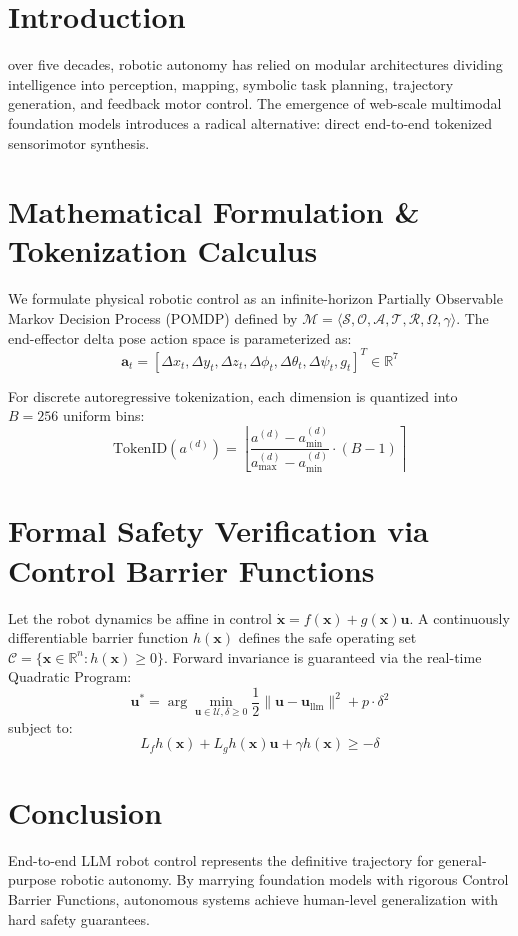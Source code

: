 \documentclass[lettersize,journal]{IEEEtran}
\begin{document}
\section{Introduction}
 over five decades, robotic autonomy has relied on modular architectures dividing intelligence into perception, mapping, symbolic task planning, trajectory generation, and feedback motor control. The emergence of web-scale multimodal foundation models introduces a radical alternative: direct end-to-end tokenized sensorimotor synthesis.

\section{Mathematical Formulation \& Tokenization Calculus}
We formulate physical robotic control as an infinite-horizon Partially Observable Markov Decision Process (POMDP) defined by $\mathcal{M} = \langle \mathcal{S}, \mathcal{O}, \mathcal{A}, \mathcal{T}, \mathcal{R}, \Omega, \gamma \rangle$. The end-effector delta pose action space is parameterized as:
\begin{equation}
\mathbf{a}_t = \left[ \Delta x_t, \Delta y_t, \Delta z_t, \Delta \phi_t, \Delta \theta_t, \Delta \psi_t, g_t \right]^T \in \mathbb{R}^7
\end{equation}

For discrete autoregressive tokenization, each dimension is quantized into $B = 256$ uniform bins:
\begin{equation}
\text{TokenID}(a^{(d)}) = \left\lfloor \frac{a^{(d)} - a_{\min}^{(d)}}{a_{\max}^{(d)} - a_{\min}^{(d)}} \cdot (B - 1) \right\rceil
\end{equation}

\section{Formal Safety Verification via Control Barrier Functions}
Let the robot dynamics be affine in control $\dot{\mathbf{x}} = f(\mathbf{x}) + g(\mathbf{x})\mathbf{u}$. A continuously differentiable barrier function $h(\mathbf{x})$ defines the safe operating set $\mathcal{C} = \{\mathbf{x} \in \mathbb{R}^n : h(\mathbf{x}) \ge 0\}$. Forward invariance is guaranteed via the real-time Quadratic Program:
\begin{equation}
\mathbf{u}^* = \arg\min_{\mathbf{u} \in \mathcal{U}, \delta \ge 0} \frac{1}{2} \|\mathbf{u} - \mathbf{u}_{\text{llm}}\|^2 + p \cdot \delta^2
\end{equation}
subject to:
\begin{equation}
L_f h(\mathbf{x}) + L_g h(\mathbf{x})\mathbf{u} + \gamma h(\mathbf{x}) \ge -\delta
\end{equation}

\section{Conclusion}
End-to-end LLM robot control represents the definitive trajectory for general-purpose robotic autonomy. By marrying foundation models with rigorous Control Barrier Functions, autonomous systems achieve human-level generalization with hard safety guarantees.



\end{document}
